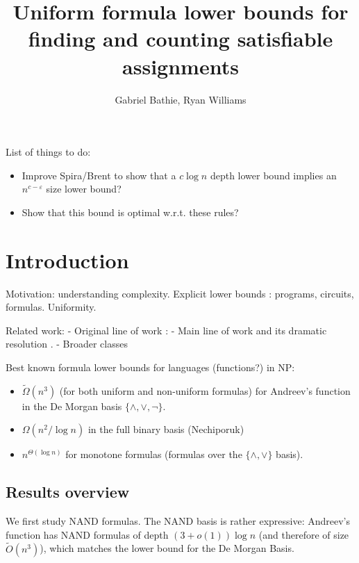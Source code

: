 \documentclass[a4paper, 11pt]{article}
\title{Uniform formula lower bounds for finding and counting satisfiable assignments}
\author{Gabriel Bathie, Ryan Williams}
\theoremstyle{plain}
\theoremstyle{definition}
\theoremstyle{remark}
\newcommand{\eps}{\varepsilon}%
\newcommand{\Omegat}[1]{\widetilde{\Omega}\left( #1 \right)}%
\newcommand{\Ot}[1]{\widetilde{O}\left( #1 \right)}%
\newcommand{\NAND}{\textsf{NAND}}%
\begin{document}
\maketitle

\begin{abstract}
\end{abstract}


List of things to do:
\begin{itemize}
	\item Improve Spira/Brent to show that a $c \log n$ depth 
	lower bound implies an $n^{c-\eps}$ size lower bound?
	\item Show that this bound is optimal w.r.t. these rules?
\end{itemize}

\section{Introduction}

Motivation: understanding complexity. Explicit lower bounds : programs, circuits, formulas.
Uniformity.

Related work:
- Original line of work : \cite{fortnow2000time,fortnow2005time}
- Main line of work \cite{williams2006inductive,williams2007time,williams2013alternation} and its dramatic resolution \cite{buss2015limits}.
- Broader classes \cite{mudigonda2020time}

Best known formula lower bounds for languages (functions?) in NP: 
\begin{itemize}
	\item $\Omegat{n^3}$ (for both uniform and non-uniform formulas) for Andreev's function \cite{hastad1998shrinkage} in the De Morgan basis $\{\wedge, \vee, \neg\}$.
	\item $\Omega(n^2/\log n)$ in the full binary basis (Nechiporuk)
	\item $n^{\Theta(\log n)}$ for monotone formulas (formulas over the $\{\wedge, \vee\}$ basis).
\end{itemize}

\subsection{Results overview}

We first study \NAND{} formulas. 
The \NAND{} basis is rather expressive: Andreev's function has \NAND{} formulas of depth $(3+o(1)) \log n$ (and therefore of size $\Ot{n^3}$), which matches the lower bound for the De Morgan Basis.
\end{document}
